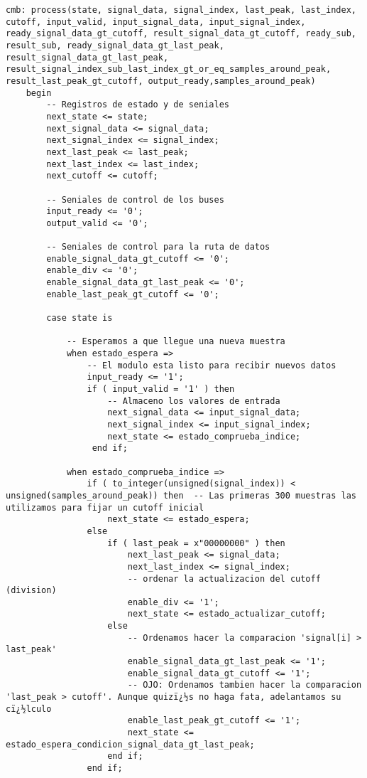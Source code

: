\begin{lstlisting}[frame=single]
    cmb: process(state, signal_data, signal_index, last_peak, last_index, cutoff, input_valid, input_signal_data, input_signal_index, ready_signal_data_gt_cutoff, result_signal_data_gt_cutoff, ready_sub, result_sub, ready_signal_data_gt_last_peak, result_signal_data_gt_last_peak, result_signal_index_sub_last_index_gt_or_eq_samples_around_peak, result_last_peak_gt_cutoff, output_ready,samples_around_peak)
    begin
        -- Registros de estado y de seniales
        next_state <= state;
        next_signal_data <= signal_data;
        next_signal_index <= signal_index;
        next_last_peak <= last_peak;
        next_last_index <= last_index;
        next_cutoff <= cutoff;
        
        -- Seniales de control de los buses
        input_ready <= '0';
        output_valid <= '0';
        
        -- Seniales de control para la ruta de datos
        enable_signal_data_gt_cutoff <= '0';
        enable_div <= '0';
        enable_signal_data_gt_last_peak <= '0';
        enable_last_peak_gt_cutoff <= '0';
    
        case state is 
        
            -- Esperamos a que llegue una nueva muestra
            when estado_espera =>
                -- El modulo esta listo para recibir nuevos datos
                input_ready <= '1';
                if ( input_valid = '1' ) then
                    -- Almaceno los valores de entrada
                    next_signal_data <= input_signal_data;
                    next_signal_index <= input_signal_index;
                    next_state <= estado_comprueba_indice;
                 end if;
                 
            when estado_comprueba_indice =>
                if ( to_integer(unsigned(signal_index)) < unsigned(samples_around_peak)) then  -- Las primeras 300 muestras las utilizamos para fijar un cutoff inicial
                    next_state <= estado_espera;
                else
                    if ( last_peak = x"00000000" ) then
                        next_last_peak <= signal_data;
                        next_last_index <= signal_index;
                        -- ordenar la actualizacion del cutoff (division)
                        enable_div <= '1';
                        next_state <= estado_actualizar_cutoff;
                    else
                        -- Ordenamos hacer la comparacion 'signal[i] > last_peak'
                        enable_signal_data_gt_last_peak <= '1';
                        enable_signal_data_gt_cutoff <= '1';
                        -- OJO: Ordenamos tambien hacer la comparacion 'last_peak > cutoff'. Aunque quizï¿½s no haga fata, adelantamos su cï¿½lculo
                        enable_last_peak_gt_cutoff <= '1';
                        next_state <= estado_espera_condicion_signal_data_gt_last_peak;
                    end if;
                end if;
                

\end{lstlisting}
